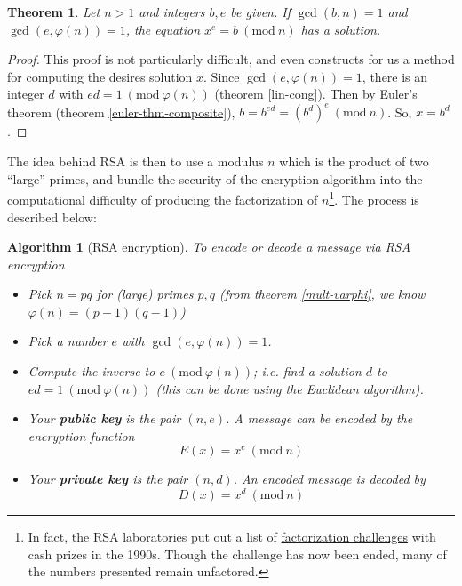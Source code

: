 \documentclass[12pt]{article}
\numberwithin{equation}{subsection}
\newtheorem{thm}[subsection]{Theorem}
\theoremstyle{note}
\newtheorem{algm}[subsection]{Algorithm}
\newcommand{\Mod}[1]{\ (\mathrm{mod}\ #1)}
\begin{document}
\begin{thm} \label{k-th-root}
Let $n>1$ and integers $b,e$ be given. If $\gcd(b,n)=1$ and $\gcd(e,\varphi(n))=1$, the equation $x^e=b\Mod{n}$ has a solution. 
\end{thm}

\begin{proof} This proof is not particularly difficult, and even constructs for us a method for computing the desires solution $x$. Since $\gcd(e,\varphi(n))=1$, there is an integer $d$ with $ed=1\Mod{\varphi(n)}$ (theorem \ref{lin-cong}). Then by Euler's theorem (theorem \ref{euler-thm-composite}), $b=b^{ed}=(b^d)^e \Mod{n}$. So, $x=b^d$. 
\end{proof}

The idea behind RSA is then to use a modulus $n$ which is the product of two ``large'' primes, and bundle the security of the encryption algorithm into the computational difficulty of producing the factorization of $n$\footnote{In fact, the RSA laboratories put out a list of \href{https://en.wikipedia.org/wiki/RSA_Factoring_Challenge}{factorization challenges} with cash prizes in the 1990s. Though the challenge has now been ended, many of the numbers presented remain unfactored.}. The process is described below:

\begin{algm}[RSA encryption] To encode or decode a message via RSA encryption \label{RSA-algm}
\begin{itemize}
	\item Pick $n=pq$ for (large) primes $p,q$ (from theorem \ref{mult-varphi}, we know $\varphi(n)=(p-1)(q-1)$)
	\item Pick a number $e$ with $\gcd(e,\varphi(n))=1$. 
	\item Compute the inverse to $e\Mod{\varphi(n)}$; i.e. find a solution $d$ to $ed=1\Mod{\varphi(n)}$ (this can be done using the Euclidean algorithm).
	\item Your \textbf{public key} is the pair $(n,e)$. A message can be encoded by the encryption function \begin{equation} E(x)=x^e\Mod{n}\end{equation}
	\item Your \textbf{private key} is the pair $(n,d)$. An encoded message is decoded by \begin{equation}D(x)=x^{d}\Mod{n}\end{equation}
\end{itemize}
\end{algm}
\end{document}
